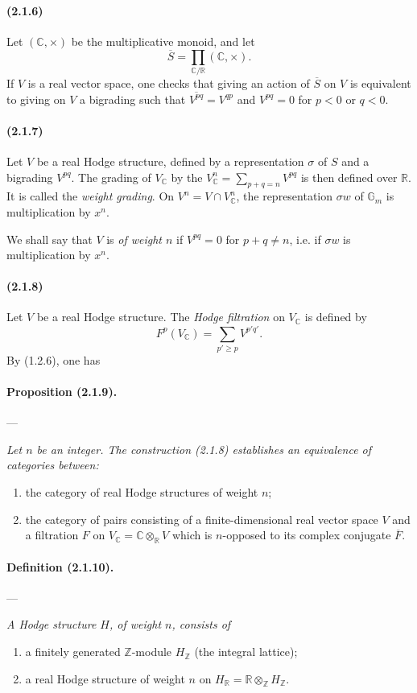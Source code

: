 \documentclass[10pt]{article}
\newcommand{\C}{\mathbb C}
\newcommand{\Z}{\mathbb Z}
\newcommand{\fg}{\guillemotright}
\newcommand{\og}{\guillemotleft}
\newcommand{\R}{\mathbb R}
\newcommand{\Gm}{\mathbb G_m}
\begin{document}
\paragraph{(2.1.6)} Let $(\C,\times)$ be the multiplicative monoid, and let
\[
\overline S=\prod_{\C/\R}(\C,\times).
\]
If $V$ is a real vector space, one checks that giving an action of $\overline S$ on $V$ is equivalent to giving on $V$ a bigrading such that $\overline{V^{pq}}=V^{qp}$ and $V^{pq}=0$ for $p<0$ or $q<0$.

\paragraph{(2.1.7)} Let $V$ be a real Hodge structure, defined by a representation $\sigma$ of $S$ and a bigrading $V^{pq}$. The grading of $V_\C$ by the $V_\C^n=\sum_{p+q=n}V^{pq}$ is then defined over $\R$. It is called the \emph{weight grading}. On $V^n=V\cap V_\C^n$, the representation $\sigma w$ of $\Gm$ is multiplication by $x^n$.

We shall say that $V$ is \emph{of weight $n$} if $V^{pq}=0$ for $p+q\ne n$, i.e. if $\sigma w$ is multiplication by $x^n$.

\paragraph{(2.1.8)} Let $V$ be a real Hodge structure. The \emph{Hodge filtration} on $V_\C$ is defined by
\[
F^p(V_\C)=\sum_{p'\ge p}V^{p'q'}.
\]
By (1.2.6), one has

\paragraph{Proposition (2.1.9).} --- {\itshape Let $n$ be an integer. The construction (2.1.8) establishes an equivalence of categories between:
\begin{enumerate}[label=\alph*)]
\item the category of real Hodge structures of weight $n$;
\item the category of pairs consisting of a finite-dimensional real vector space $V$ and a filtration $F$ on $V_\C=\C\otimes_\R V$ which is $n$-opposed to its complex conjugate $\overline F$.
\end{enumerate}}

\paragraph{Definition (2.1.10).} --- {\itshape A Hodge structure $H$, of weight $n$, consists of
\begin{enumerate}[label=\alph*)]
\item a finitely generated $\Z$-module $H_\Z$ (the \og integral lattice\fg{});
\item a real Hodge structure of weight $n$ on $H_\R=\R\otimes_\Z H_\Z$.
\end{enumerate}}
\end{document}
